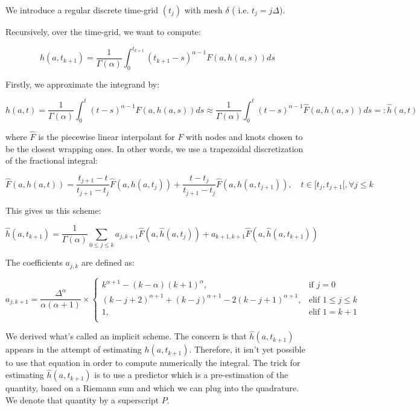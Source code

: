 We introduce a regular discrete time-grid $(t_j)$ with mesh $\delta$ ( i.e. $t_j = j \Delta$). 

Recursively, over the time-grid, we want to compute:

$$ h(a,t_{k+1} ) = \frac 1 { \Gamma(\alpha)} \int_0^{t_{k+1}} (t_{k+1}-s)^{\alpha - 1} F ( a, h(a,s) ) ds $$ 

Firstly, we approximate the integrand by:

$$ h(a, t) = \frac 1 { \Gamma(\alpha)} \int_0^t (t-s)^{\alpha - 1} F ( a, h(a,s) ) ds 
\approx  \frac 1 { \Gamma(\alpha)}
\int_0^t (t-s)^{\alpha - 1} \hat{F} ( a, h(a,s) ) ds =: \hat{h}(a,t) $$

where $\hat{F}$ is the piecewise linear interpolant for $F$ with nodes and knots chosen to be the closest wrapping ones. In other words, we use a trapezoidal discretization of the fractional integral:

$$ \hat{F} ( a, h(a, t) ) = \frac{t_{j+1} - t }{ t_{j+1} - t_j } \hat{F}(a, h(a,t_j))     + \frac{t - t_j }{ t_{j+1} - t_j } \hat{F}(a, h(a,t_{j+1}) ), \quad t \in [ t_j, t_{j+1}[, \forall j \leq k $$   

This gives us this scheme:

$$ \hat{h}(a,t_{k+1}) = \frac 1 { \Gamma(\alpha)}  \sum_{0 \leq j \leq k } a_{j,k+1} \hat{F}( a, \hat{h} ( a,t_j ) )  + a_{k+1, k+1}  \hat{F}( a, \hat{h} ( a,t_{k+1} ) ) $$

The coefficients $a_{j,k}$ are defined as:


$$
a_{j, k+1} = \frac{\Delta^{\alpha} }{\alpha ( \alpha +1) } \times \left \{
    \begin{array}{lll}
        k^{\alpha +1} - ( k-\alpha)(k+1)^{\alpha},  & \mbox{if } j = 0  \\
        (k-j+2)^{\alpha +1} + (k-j)^{\alpha + 1} -2( k - j +1)^{\alpha + 1}, & \mbox{elif } 1 \leq j \leq k  \\
        1, & \mbox{elif } 1 = k+1 \\
    \end{array}
\right.
$$


We derived what's called an implicit scheme. The concern is that $\hat{h} ( a,t_{k+1} )$ appears in the attempt of estimating $h ( a,t_{k+1} )$. Therefore, it isn't yet possible to use that equation in order to compute numerically the integral. The trick for estimating  $\hat{h} ( a,t_{k+1} )$ is to use a predictor which is a pre-estimation of the quantity, based on a Riemann sum and which we can plug into the quadrature. We denote that quantity by a superscript $P$.

